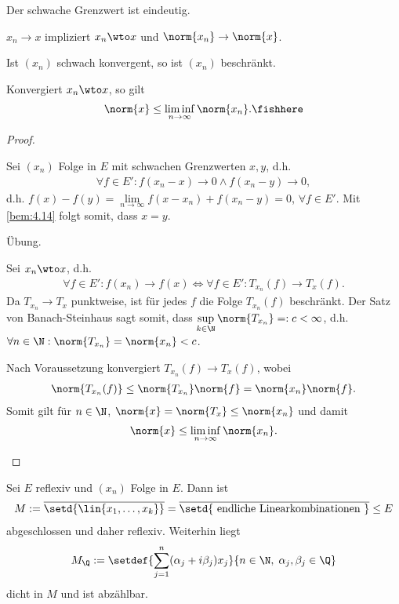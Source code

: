 \begin{prop}
\label{prop:4.26}
\begin{propenum}
  \item Der schwache Grenzwert ist eindeutig.
  \item $x_n\to x$ impliziert $x_n\wto x$ und $\norm{x_n}\to\norm{x}$.
  \item Ist $(x_n)$ schwach konvergent, so ist $(x_n)$ beschränkt.
  \item Konvergiert $x_n\wto x$, so gilt
\begin{align*}
\norm{x} \le \liminf\limits_{n\to\infty} \norm{x_n}.\fishhere
\end{align*}
\end{propenum}
\end{prop}
\begin{proof}
\begin{proofenum}
  \item Sei $(x_n)$ Folge in $E$ mit schwachen Grenzwerten $x,y$, d.h.
\begin{align*}
\forall f\in E' : f(x_n-x)\to 0\land f(x_n-y)\to 0,
\end{align*}
d.h. $f(x)-f(y) = \lim\limits_{n\to \infty} f(x-x_n)+f(x_n-y) = 0$, $\forall
f\in E'$. Mit \ref{bem:4.14} folgt somit, dass $x=y$.
\item Übung.
\item Sei $x_n\wto x$, d.h.
\begin{align*}
\forall f\in E' : f(x_n)\to f(x) 
\Leftrightarrow
\forall f\in E' : T_{x_n}(f)\to T_{x}(f). 
\end{align*}
Da $T_{x_n}\to T_x$ punktweise, ist für jedes $f$ die Folge $T_{x_n}(f)$
beschränkt. Der Satz von Banach-Steinhaus sagt somit, dass
$\sup\limits_{k\in\N} \norm{T_{x_n}} =: c < \infty$, d.h. $\forall n\in\N :
\norm{T_{x_n}}=\norm{x_n}<c$.
\item Nach Voraussetzung konvergiert $T_{x_n}(f)\to T_x (f)$, wobei
\begin{align*}
\norm{T_{x_n}(f)} \le \norm{T_{x_n}}\norm{f} = \norm{x_n}\norm{f}.
\end{align*}
Somit gilt für $n\in\N$, $\norm{x} = \norm{T_x} \le \norm{x_n}$ und damit
\begin{align*}
\norm{x} \le \liminf\limits_{n\to\infty}\norm{x_n}.\qedhere
\end{align*}
\end{proofenum}
\end{proof}

\begin{prop}[Beobachtung]
\label{prop:4.27}
Sei $E$ reflexiv und $(x_n)$ Folge in $E$. Dann ist
\begin{align*}
M := \overline{\setd{\lin{x_1,\ldots,x_k}}} = \overline{\setd{\text{ endliche
Linearkombinationen }}} \le E
\end{align*}
abgeschlossen und daher reflexiv. Weiterhin liegt
\begin{align*}
M_\Q := 
\setdef{\sum\limits_{j=1}^n (\alpha_j + i\beta_j) x_j}{n\in\N,\;
\alpha_j,\beta_j\in\Q}
\end{align*}
dicht in $M$ und ist abzählbar.\fishhere
\end{prop}

